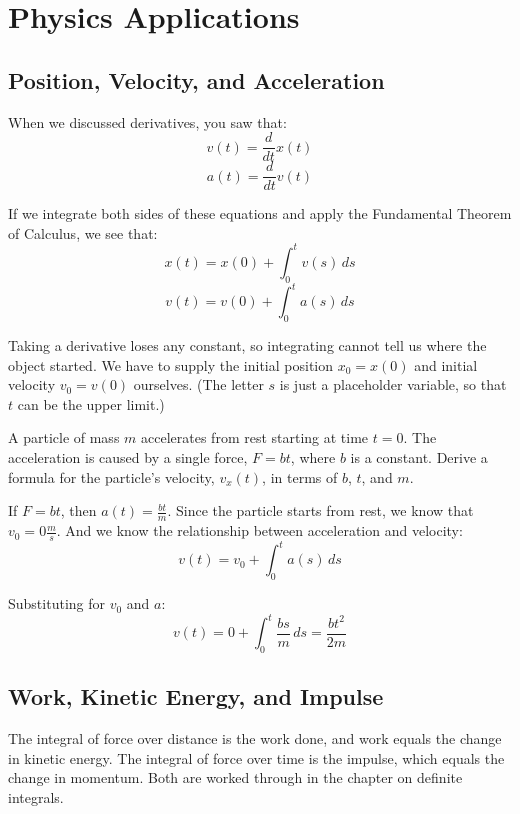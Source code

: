 
\section{Physics Applications}
\subsection{Position, Velocity, and Acceleration}

When we discussed derivatives, you saw that:
$$v(t) = \frac{d}{dt} x(t)$$
$$a(t) = \frac{d}{dt} v(t)$$

If we integrate both sides of these equations and apply the Fundamental Theorem of Calculus, we see that:
$$x(t) = x(0) + \int_0^t v(s)\,ds$$
$$v(t) = v(0) + \int_0^t a(s)\,ds$$

Taking a derivative loses any constant, so integrating cannot tell us where
the object started. We have to supply the initial position $x_0 = x(0)$
and initial velocity $v_0 = v(0)$ ourselves. (The letter $s$ is just a
placeholder variable, so that $t$ can be the upper limit.)


\begin{Exercise} A particle of mass $m$ accelerates
from rest starting at time $t = 0$. The acceleration is caused by a single force, 
$F = bt$, where $b$ is a constant. Derive a formula for the particle's velocity, 
$v_x(t)$, in terms of $b$, $t$, and $m$. 
\end{Exercise}

\begin{Answer}[ref = velocity]
If $F = bt$, then $a(t) = \frac{bt}{m}$. Since the particle starts from rest, we 
know that $v_0 = 0 \frac{m}{s}$. And we know the relationship between acceleration
and velocity:
$$v(t) = v_0 + \int_0^t a(s) \, ds$$

Substituting for $v_0$ and $a$:
$$v(t) = 0 + \int_0^t \frac{bs}{m} \, ds = \frac{bt^2}{2m}$$
\end{Answer}

\subsection{Work, Kinetic Energy, and Impulse}
The integral of force over distance is the work done, and work equals the change in kinetic energy. The integral of force over time is the impulse, which equals the change in momentum. Both are worked through in the chapter on definite integrals.

